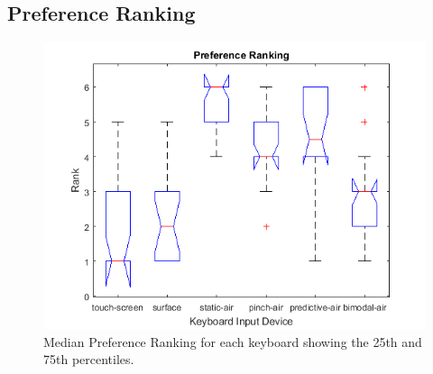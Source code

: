 \subsection{Preference Ranking}
\begin{figure}[h]
	\centering
	\includegraphics{fig_ranking_boxplot}
	\caption[Preference Ranking Boxplot]{Median Preference Ranking for each keyboard showing the 25th and 75th percentiles.}
	\label{fig_ranking_boxplot}
\end{figure}


